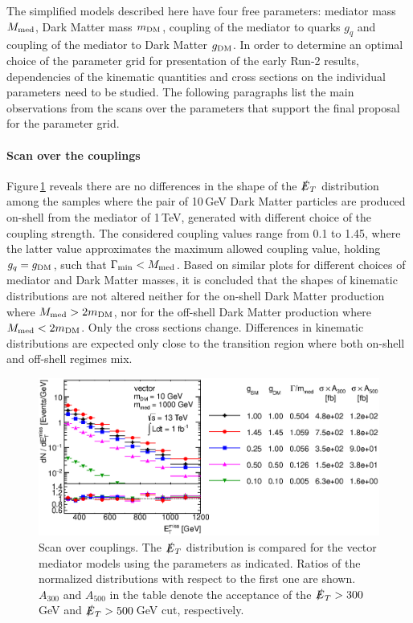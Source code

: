 The simplified models described here have four free parameters: mediator mass $M_{\rm{med}}$, Dark Matter mass $m_{\rm{DM}}$, coupling of the mediator to quarks $g_q$ and coupling of the mediator to Dark Matter $g_{\rm{DM}}$. In order to determine an optimal choice of the parameter grid for presentation of the early Run-2 results, dependencies of the kinematic quantities and cross sections on the individual parameters need to be studied. The following paragraphs list the main observations from the scans over the parameters that support the final proposal for the parameter grid.


\paragraph{Scan over the couplings}

Figure\,\ref{fig:monojet_scan_V_g} reveals there are no differences in the shape of the $\slashed{E}_T$ distribution among the samples where the pair of 10\,GeV Dark Matter particles are produced on-shell from the mediator of 1\,TeV, generated with different choice of the coupling strength. The considered coupling values range from 0.1 to 1.45, where the latter value approximates the maximum allowed coupling value, holding $g_q=g_{\rm{DM}}$, such that $\Gamma_{\rm{min}} < M_{\rm{med}}$.
Based on similar plots for different choices of mediator and Dark Matter masses, it is concluded that the shapes of kinematic distributions are not altered neither for the on-shell Dark Matter production where $M_{\rm{med}}>2m_{\rm{DM}}$, nor for the off-shell Dark Matter production where $M_{\rm{med}}<2m_{\rm{DM}}$. Only the cross sections change.
Differences in kinematic distributions are expected only close to the transition region where both on-shell and off-shell regimes mix.
\begin{figure}
\centering
\includegraphics[width=0.9\linewidth]{figures/monojet/scan_g_V_10_1000.eps}
\caption{Scan over couplings. The $\slashed{E}_T$ distribution is compared for the vector mediator models using the parameters as indicated. Ratios of the normalized distributions with respect to the first one are shown. $A_{300}$ and $A_{500}$ in the table denote the acceptance of the $\slashed{E}_T>300$\,GeV and $\slashed{E}_T>500$\,GeV cut, respectively.}
\label{fig:monojet_scan_V_g}
\end{figure}

